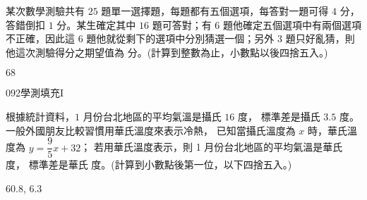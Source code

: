 \begin{QUESTIONS}
\begin{QUESTION}
\begin{QBODY}
            某次數學測驗共有 $25$ 題單一選擇題，每題都有五個選項，每答對一題可得 $4$ 分，答錯倒扣 $1$ 分。某生確定其中 $16$ 題可答對；有 $6$ 題他確定五個選項中有兩個選項不正確，因此這 $6$ 題他就從剩下的選項中分別猜選一個；另外 $3$ 題只好亂猜，則他這次測驗得分之期望值為 
            \TCNBOX{\TCN\TCN} 分。(計算到整數為止，小數點以後四捨五入。)
        \end{QBODY}
        \begin{QFROMS}
        \end{QFROMS}
        \begin{QTAGS}\end{QTAGS}
        \begin{QANS}
            $68$
        \end{QANS}
        \begin{QSOLLIST}
        \end{QSOLLIST}
        \begin{QEMPTYSPACE}
        \end{QEMPTYSPACE}
    \end{QUESTION}
    \begin{QUESTION}
        \begin{ExamInfo}{092}{學測}{填充}{I}
        \end{ExamInfo}
        \begin{ExamAnsRateInfo}{38}{70}{35}{9}
        \end{ExamAnsRateInfo}
        \begin{QBODY}
            根據統計資料，$1$ 月份台北地區的平均氣溫是攝氏 $16$ 度，
            標準差是攝氏 $3.5$ 度。一般外國朋友比較習慣用華氏溫度來表示冷熱，
            已知當攝氏溫度為 $x$ 時，華氏溫度為 $y =\dfrac{9}{5}x + 32$；
            若用華氏溫度表示，則 1 月份台北地區的平均氣溫是華氏 
             度，
            標準差是華氏 
             度。(計算到小數點後第一位，以下四捨五入。)
        \end{QBODY}
        \begin{QFROMS}
        \end{QFROMS}
        \begin{QTAGS}\end{QTAGS}
        \begin{QANS}
            $60.8$, $6.3$
        \end{QANS}
        \begin{QSOLLIST}
        \end{QSOLLIST}
        \begin{QEMPTYSPACE}
        \end{QEMPTYSPACE}
    \end{QUESTION}
\end{QUESTIONS}
